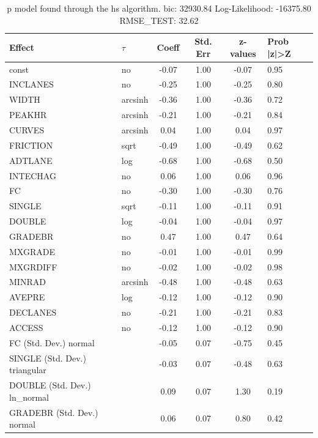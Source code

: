 \begin{table}
	\caption{p model found through the hs algorithm. bic: 32930.84 Log-Likelihood: -16375.80 RMSE_TEST: 32.62}
	\begin{center}
		\begin{tabular}{|l|l|c|c|c|l|}
			\hline
			Effect & $\tau$ & Coeff & Std. Err & z-values & Prob |z|>Z \\
			\hline
			const & no & -0.07 & 1.00 & -0.07 & 0.95 \\
			\hline
			INCLANES & no & -0.25 & 1.00 & -0.25 & 0.80 \\
			\hline
			WIDTH & arcsinh & -0.36 & 1.00 & -0.36 & 0.72 \\
			\hline
			PEAKHR & arcsinh & -0.21 & 1.00 & -0.21 & 0.84 \\
			\hline
			CURVES & arcsinh & 0.04 & 1.00 & 0.04 & 0.97 \\
			\hline
			FRICTION & sqrt & -0.49 & 1.00 & -0.49 & 0.62 \\
			\hline
			ADTLANE & log & -0.68 & 1.00 & -0.68 & 0.50 \\
			\hline
			INTECHAG & no & 0.06 & 1.00 & 0.06 & 0.96 \\
			\hline
			FC & no & -0.30 & 1.00 & -0.30 & 0.76 \\
			\hline
			SINGLE & sqrt & -0.11 & 1.00 & -0.11 & 0.91 \\
			\hline
			DOUBLE & log & -0.04 & 1.00 & -0.04 & 0.97 \\
			\hline
			GRADEBR & no & 0.47 & 1.00 & 0.47 & 0.64 \\
			\hline
			MXGRADE & no & -0.01 & 1.00 & -0.01 & 0.99 \\
			\hline
			MXGRDIFF & no & -0.02 & 1.00 & -0.02 & 0.98 \\
			\hline
			MINRAD & arcsinh & -0.48 & 1.00 & -0.48 & 0.63 \\
			\hline
			AVEPRE & log & -0.12 & 1.00 & -0.12 & 0.90 \\
			\hline
			DECLANES & no & -0.21 & 1.00 & -0.21 & 0.83 \\
			\hline
			ACCESS & no & -0.12 & 1.00 & -0.12 & 0.90 \\
			\hline
			FC (Std. Dev.) normal &  & -0.05 & 0.07 & -0.75 & 0.45 \\
			\hline
			SINGLE (Std. Dev.) triangular &  & -0.03 & 0.07 & -0.48 & 0.63 \\
			\hline
			DOUBLE (Std. Dev.) ln_normal &  & 0.09 & 0.07 & 1.30 & 0.19 \\
			\hline
			GRADEBR (Std. Dev.) normal &  & 0.06 & 0.07 & 0.80 & 0.42 \\

\end{tabular}
\end{center}
\end{table}
